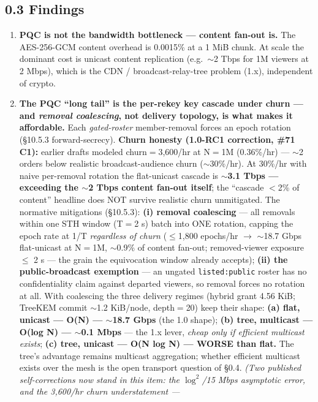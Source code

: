 \documentclass[10pt]{article}
\begin{document}
\subsection*{0.3 Findings}
\begin{enumerate}\setlength\itemsep{2pt}
\item \textbf{PQC is not the bandwidth bottleneck --- content fan-out is.} The
AES-256-GCM content overhead is 0.0015\% at a 1 MiB chunk. At scale the dominant
cost is unicast content replication (e.g.\ $\sim$2 Tbps for 1M viewers at 2 Mbps),
which is the CDN / broadcast-relay-tree problem (1.x), independent of crypto.
\item \textbf{The PQC ``long tail'' is the per-rekey key cascade under churn ---
and \emph{removal coalescing}, not delivery topology, is what makes it
affordable.} Each \emph{gated-roster} member-removal forces an epoch rotation
(\S10.5.3 forward-secrecy). \textbf{Churn honesty (1.0-RC1 correction, \#71 C1):}
earlier drafts modeled churn$=$3{,}600/hr at N$=$1M (0.36\%/hr) --- $\sim$2 orders
below realistic broadcast-audience churn ($\sim$30\%/hr). At 30\%/hr with naive
per-removal rotation the flat-unicast cascade is $\sim$\textbf{3.1 Tbps ---
exceeding the $\sim$2 Tbps content fan-out itself}; the ``cascade $<$2\% of
content'' headline does NOT survive realistic churn unmitigated. The normative
mitigations (\S10.5.3): \textbf{(i) removal coalescing} --- all removals within
one STH window (T$=$2 s) batch into ONE rotation, capping the epoch rate at 1/T
\emph{regardless of churn} ($\leq$1{,}800 epochs/hr $\rightarrow$ $\sim$18.7 Gbps
flat-unicast at N$=$1M, $\sim$0.9\% of content fan-out; removed-viewer exposure
$\leq$ 2 s --- the grain the equivocation window already accepts); \textbf{(ii)
the public-broadcast exemption} --- an ungated \texttt{listed:public} roster has
no confidentiality claim against departed viewers, so removal forces no rotation
at all. With coalescing the three delivery regimes (hybrid grant 4.56 KiB;
TreeKEM commit $\sim$1.2 KiB/node, depth$=$20) keep their shape: \textbf{(a)
flat, unicast --- O(N) --- $\sim$18.7 Gbps} (the 1.0 shape); \textbf{(b) tree,
multicast --- O(log N) --- $\sim$0.1 Mbps} --- the 1.x lever, \emph{cheap only if
efficient multicast exists}; \textbf{(c) tree, unicast --- O(N log N) --- WORSE
than flat.} The tree's advantage remains multicast aggregation; whether efficient
multicast exists over the mesh is the open transport question of \S0.4.
\emph{(Two published self-corrections now stand in this item: the
$\log^2$/15 Mbps asymptotic error, and the 3{,}600/hr churn understatement ---
}
\end{enumerate}
\end{document}

